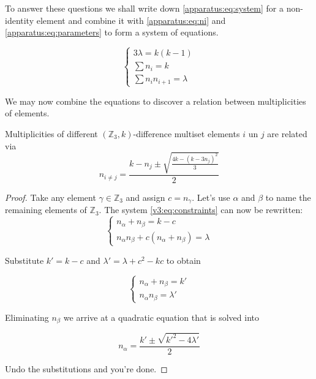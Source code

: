     To answer these questions we shall write down \eqref{apparatus:eq:system} for a non-identity element and combine it with \eqref{apparatus:eq:ni} and \eqref{apparatus:eq:parameters} to form a system of equations.

    \begin{equation}
        \label{v3:eq:constraints}
        \begin{cases}
            3\lambda = k(k-1) \\
            \sum n_i = k \\
            \sum n_i n_{i+1} = \lambda
        \end{cases}
    \end{equation}

    We may now combine the equations to discover a relation between multiplicities of elements.

    \begin{theorem}
        \label{v3:theorem:relations}
        Multiplicities of different $(\mathbb Z_3,k)$-difference multiset elements $i$ un $j$ are related via
        \begin{equation}
            \label{v3:eq:relations}
            n_{i\neq j} = \frac{k-n_j \pm \sqrt{\frac{4k-(k-3n_j)^2}{3}}}{2}
        \end{equation}
    \end{theorem}

    \begin{proof}
        Take any element $\gamma \in \mathbb Z_3$ and assign $c = n_\gamma$. Let's use $\alpha$ and $\beta$ to name the remaining elements of $\mathbb Z_3$. The system \eqref{v3:eq:constraints} can now be rewritten:
        \begin{equation}
            \begin{cases}
                n_\alpha + n_\beta = k - c \\
                n_\alpha n_\beta + c (n_\alpha + n_\beta)  = \lambda 
            \end{cases}
        \end{equation}
        
        Substitute $k'=k-c$ and $\lambda' = \lambda + c^2-kc$ to obtain
        
        \begin{equation}
            \begin{cases}
                n_\alpha + n_\beta = k' \\
                n_\alpha n_\beta = \lambda'
            \end{cases}
        \end{equation}
        
        Eliminating $n_\beta$ we arrive at a quadratic equation that is solved into
        
        \begin{equation}
            n_\alpha = \frac{k' \pm \sqrt{k'^2-4\lambda'}}{2}
        \end{equation}
        
        Undo the substitutions and you're done.
    \end{proof}

